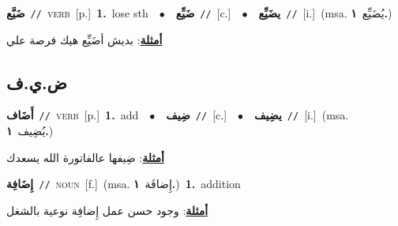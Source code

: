 \documentclass[10pt,a4paper,twoside]{article} %
\begin{document}
\begin{multicols}{2}
{\setlength\topsep{0pt}\textbf{\foreignlanguage{arabic}{ضَيَّع}}\ {\color{gray}\texttt{//}\color{black}}\ \textsc{verb}\ [p.]\ \textbf{1.}~lose sth\ \ $\bullet$\ \ \setlength\topsep{0pt}\textbf{\foreignlanguage{arabic}{ضَيِّع}}\ {\color{gray}\texttt{//}\color{black}}\ [c.]\ \ $\bullet$\ \ \setlength\topsep{0pt}\textbf{\foreignlanguage{arabic}{يضَيِّع}}\ {\color{gray}\texttt{//}\color{black}}\ [i.]\ \color{gray}(msa. \foreignlanguage{arabic}{يُضَيِّع}~\foreignlanguage{arabic}{\textbf{١.}})\color{black}\  \begin{flushright}\color{gray}\foreignlanguage{arabic}{\textbf{\underline{\foreignlanguage{arabic}{أمثلة}}}: بديش أضَيِّع هيك فرصة علي}\end{flushright}\color{black}} \vspace{2mm}

\vspace{-3mm}
\subsection*{\color{blue}\foreignlanguage{arabic}{ض.ي.ف}\color{blue}{}} 

{\setlength\topsep{0pt}\textbf{\foreignlanguage{arabic}{أَضَاف}}\ {\color{gray}\texttt{//}\color{black}}\ \textsc{verb}\ [p.]\ \textbf{1.}~add\ \ $\bullet$\ \ \setlength\topsep{0pt}\textbf{\foreignlanguage{arabic}{ضِيف}}\ {\color{gray}\texttt{//}\color{black}}\ [c.]\ \ $\bullet$\ \ \setlength\topsep{0pt}\textbf{\foreignlanguage{arabic}{يضِيف}}\ {\color{gray}\texttt{//}\color{black}}\ [i.]\ \color{gray}(msa. \foreignlanguage{arabic}{يُضِيف}~\foreignlanguage{arabic}{\textbf{١.}})\color{black}\  \begin{flushright}\color{gray}\foreignlanguage{arabic}{\textbf{\underline{\foreignlanguage{arabic}{أمثلة}}}: ضِيفها عالفاتورة الله يسعدك}\end{flushright}\color{black}} \vspace{2mm}

{\setlength\topsep{0pt}\textbf{\foreignlanguage{arabic}{إِضَافِة}}\ {\color{gray}\texttt{//}\color{black}}\ \textsc{noun}\ [f.]\ \color{gray}(msa. \foreignlanguage{arabic}{إِضافَة}~\foreignlanguage{arabic}{\textbf{١.}})\color{black}\ \textbf{1.}~addition\  \begin{flushright}\color{gray}\foreignlanguage{arabic}{\textbf{\underline{\foreignlanguage{arabic}{أمثلة}}}: وجود حسن عمل إِضافِة نوعية بالشغل}\end{flushright}\color{black}} \vspace{2mm}


\end{multicols}
\end{document}

